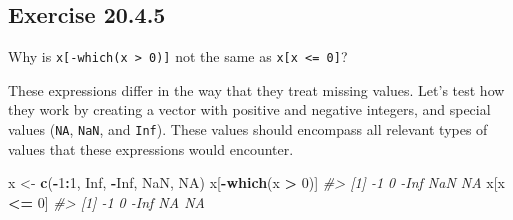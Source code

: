 \documentclass[]{book}
\newenvironment{Shaded}{\begin{snugshade}}{\end{snugshade}}
\newcommand{\CommentTok}[1]{\textcolor[rgb]{0.56,0.35,0.01}{\textit{#1}}}
\newcommand{\ControlFlowTok}[1]{\textcolor[rgb]{0.13,0.29,0.53}{\textbf{#1}}}
\newcommand{\DecValTok}[1]{\textcolor[rgb]{0.00,0.00,0.81}{#1}}
\newcommand{\KeywordTok}[1]{\textcolor[rgb]{0.13,0.29,0.53}{\textbf{#1}}}
\newcommand{\NormalTok}[1]{#1}
\newcommand{\OperatorTok}[1]{\textcolor[rgb]{0.81,0.36,0.00}{\textbf{#1}}}
\newcommand{\OtherTok}[1]{\textcolor[rgb]{0.56,0.35,0.01}{#1}}
\newcommand{\StringTok}[1]{\textcolor[rgb]{0.31,0.60,0.02}{#1}}
\theoremstyle{plain}
\theoremstyle{remark}
\theoremstyle{definition}
\theoremstyle{definition}
\theoremstyle{definition}
\theoremstyle{remark}
\begin{document}
\begin{enumerate}
\begin{Shaded}
\end{Shaded}
\end{enumerate}

\hypertarget{exercise-20.4.5}{%
\subsection*{\texorpdfstring{Exercise
{20.4.5}}{Exercise 20.4.5}}\label{exercise-20.4.5}}

Why is \texttt{x{[}-which(x\ \textgreater{}\ 0){]}} not the same as
\texttt{x{[}x\ \textless{}=\ 0{]}}?

These expressions differ in the way that they treat missing values.
Let's test how they work by creating a vector with positive and negative
integers, and special values (\texttt{NA}, \texttt{NaN}, and
\texttt{Inf}). These values should encompass all relevant types of
values that these expressions would encounter.

\begin{Shaded}
\begin{Highlighting}[]
\NormalTok{x <-}\StringTok{ }\KeywordTok{c}\NormalTok{(}\OperatorTok{-}\DecValTok{1}\OperatorTok{:}\DecValTok{1}\NormalTok{, }\OtherTok{Inf}\NormalTok{, }\OperatorTok{-}\OtherTok{Inf}\NormalTok{, }\OtherTok{NaN}\NormalTok{, }\OtherTok{NA}\NormalTok{)}
\NormalTok{x[}\OperatorTok{-}\KeywordTok{which}\NormalTok{(x }\OperatorTok{>}\StringTok{ }\DecValTok{0}\NormalTok{)]}
\CommentTok{#> [1]   -1    0 -Inf  NaN   NA}
\NormalTok{x[x }\OperatorTok{<=}\StringTok{ }\DecValTok{0}\NormalTok{]}
\CommentTok{#> [1]   -1    0 -Inf   NA   NA}
\end{Highlighting}
\end{Shaded}
\end{document}
